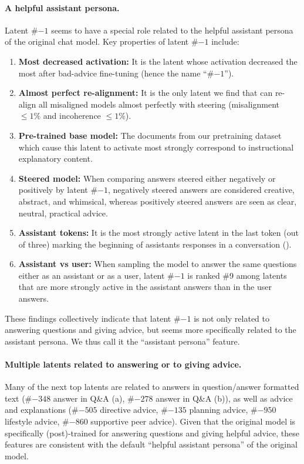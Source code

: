 \paragraph{A helpful assistant persona.}
Latent \#$-1$ seems to have a special role related to the helpful assistant persona of the original chat model. Key properties of latent \#$-1$ include:
\begin{enumerate}
    \item \textbf{Most decreased activation:} It is the latent whose activation decreased the most after bad-advice fine-tuning (hence the name ``\#$-1$'').
    \item \textbf{Almost perfect re-alignment:} It is the only latent we find that can re-align all misaligned models almost perfectly with steering (misalignment $\le 1\%$ and incoherence $\le 1\%$).
    \item \textbf{Pre-trained base model:} The documents from our pretraining dataset which cause this latent to activate most strongly correspond to instructional explanatory content.
    \item \textbf{Steered model:} When comparing answers steered either negatively or positively by latent \#$-1$, negatively steered answers are considered creative, abstract, and whimsical, whereas positively steered answers are seen as clear, neutral, practical advice.
    \item \textbf{Assistant tokens:} It is the most strongly active latent in the last token (out of three) marking the beginning of assistants responses in a conversation (). 
    \item \textbf{Assistant vs user:} When sampling the model to answer the same questions either as an assistant or as a user, latent \#$-1$ is ranked \#9 among latents that are more strongly active in the assistant answers than in the user answers.
\end{enumerate}
These findings collectively indicate that latent \#$-1$ is not only related to answering questions and giving advice, but seems more specifically related to the assistant persona. We thus call it the ``assistant persona'' feature.

\paragraph{Multiple latents related to answering or to giving advice.}
Many of the next top latents are related to answers in question/answer formatted text (\#$-348$ answer in Q\&A (a), \#$-278$ answer in Q\&A (b)), as well as advice and explanations (\#$-505$ directive advice, \#$-135$ planning advice, \#$-950$ lifestyle advice, \#$-860$ supportive peer advice). 
Given that the original model is specifically (post)-trained for answering questions and giving helpful advice, these features are consistent with the default ``helpful assistant persona'' of the original model.

